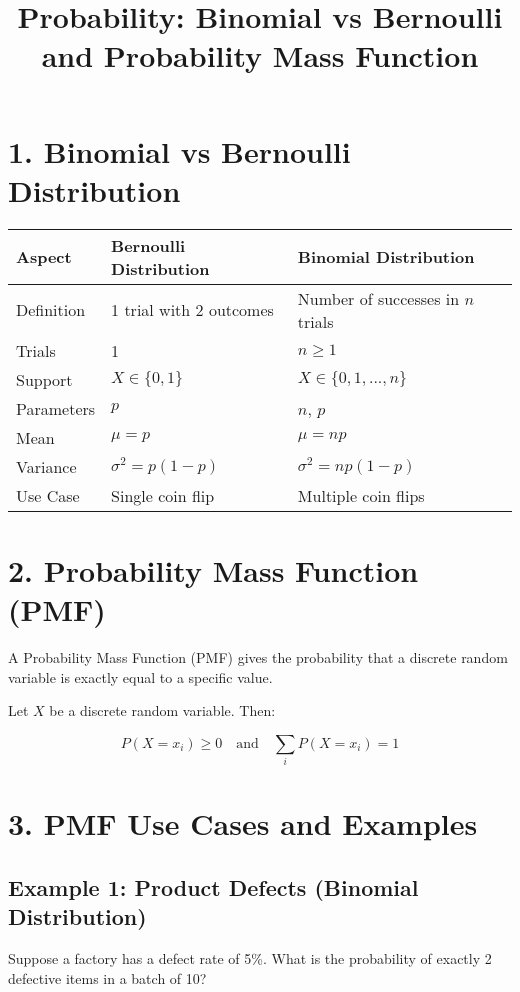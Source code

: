\documentclass[12pt]{article}
\title{\vspace{-2em}Probability: Binomial vs Bernoulli and Probability Mass Function\vspace{-1em}}
\date{}
\begin{document}
\maketitle

\section*{1. Binomial vs Bernoulli Distribution}

\begin{tabular}{@{}lll@{}}
\toprule
\textbf{Aspect} & \textbf{Bernoulli Distribution} & \textbf{Binomial Distribution} \\
\midrule
Definition & 1 trial with 2 outcomes & Number of successes in $n$ trials \\
Trials & 1 & $n \geq 1$ \\
Support & $X \in \{0, 1\}$ & $X \in \{0, 1, ..., n\}$ \\
Parameters & $p$ & $n$, $p$ \\
Mean & $\mu = p$ & $\mu = np$ \\
Variance & $\sigma^2 = p(1 - p)$ & $\sigma^2 = np(1 - p)$ \\
Use Case & Single coin flip & Multiple coin flips \\
\bottomrule
\end{tabular}

\section*{2. Probability Mass Function (PMF)}

A Probability Mass Function (PMF) gives the probability that a discrete random variable is exactly equal to a specific value.

Let $X$ be a discrete random variable. Then:

\[
P(X = x_i) \geq 0 \quad \text{and} \quad \sum_i P(X = x_i) = 1
\]

\section*{3. PMF Use Cases and Examples}

\subsection*{Example 1: Product Defects (Binomial Distribution)}

Suppose a factory has a defect rate of 5\%. What is the probability of exactly 2 defective items in a batch of 10?
\end{document}
